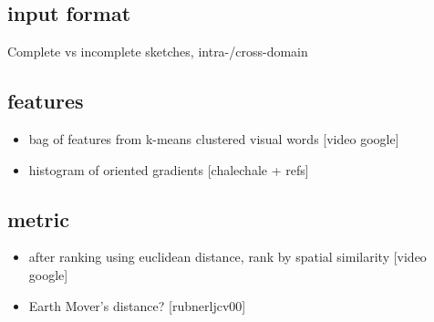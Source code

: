\subsection{input format}
Complete vs incomplete sketches, intra-/cross-domain

\subsection{features}

\begin{itemize}
    \item bag of features from k-means clustered visual words [video google]
    \item histogram of oriented gradients [chalechale + refs]
\end{itemize}

\subsection{metric}

\begin{itemize}
    \item after ranking using euclidean distance, rank by spatial similarity [video google]
    \item Earth Mover's distance? [rubnerljcv00]
\end{itemize}
